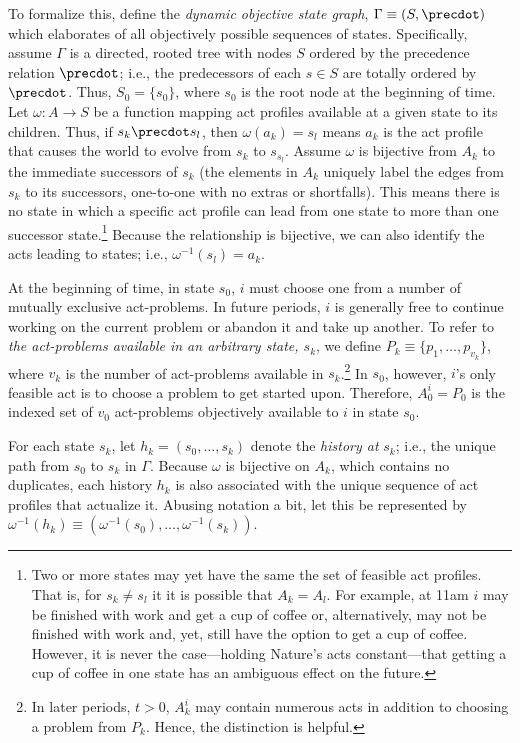 \documentclass[
11pt,
titlepage,
reqno,
]{article}%
\theoremstyle{definition}
\begin{document}
To formalize this,  define the \textit{dynamic objective state graph},  $\Gamma\equiv( S,\precdot)$ which elaborates of all objectively possible sequences of states.
Specifically, assume $\Gamma$ is a directed, rooted tree with nodes $S$ ordered by the precedence relation $\precdot$; i.e., the predecessors of each $s\in S$ are totally ordered by $\precdot$. 
Thus, $S_0=\{s_0\}$, where $s_0$ is the root node at the beginning of time.
Let $\omega:A\rightarrow S$ be a function mapping act profiles available at a given state to its children.	
Thus, if $s_k\precdot s_{l}$, then $\omega(a_{k})=s_{l}$ means  $a_{k}$ is the act profile that causes the world to evolve from $s_k$ to $s_{s_{l}}$.
Assume $\omega$ is bijective from $A_k$ to the immediate successors of $s_k$ (the elements in $A_k$ uniquely label the edges from $s_k$ to its successors, one-to-one with no extras or shortfalls).
This means there is no state in which a specific act profile can lead from one state to more than one successor state.\footnote
{ 
	Two or more states may yet have the same the set of feasible act profiles. That is, for $s_k\ne s_l$ it it is possible that $A_k=A_{l}$. For example, at 11am $i$ may be finished with  work and get a cup of coffee or, alternatively, may not be finished with work and, yet, still have the option to get a cup of coffee. However, it is never the case---holding Nature's acts constant---that getting a cup of coffee in one state has an ambiguous effect on the future.
}
Because the relationship is bijective, we can also identify the acts leading to states; i.e., $\omega^{-1}(s_{l})=a_{k}$.

At the beginning of time, in state $s_0$, $i$ must choose one from  a number of mutually exclusive act-problems.
In future periods, $i$ is generally free to continue working on the current problem or abandon it and take up another.  
To refer to \textit{the act-problems available in an arbitrary state, $s_k$}, we define $P_k\equiv \{p_1,\ldots,p_{v_k}\}$, where $v_k$ is the number of act-problems available in $s_k$.\footnote
{
	In later periods, $t>0$, $A^i_k$ may contain numerous acts in addition to choosing a problem from $P_k$. Hence, the distinction is helpful.
}
In $s_0$, however, $i$'s only feasible act is to choose a problem to get started upon.
Therefore, $A^i_{0}=P_0$ is the indexed set of $v_0$ act-problems objectively available to $i$ in state $s_0$.
	
For each state $s_k$, let $h_k=(s_0,\ldots,s_k)$ denote the \textit{history at} $s_k$; i.e., the unique path from $s_0$ to $s_k$ in $\Gamma$.
Because $\omega$ is bijective on $A_k$, which contains no duplicates, each history $h_k$ is also associated with the unique sequence of act profiles that actualize it.
Abusing notation a bit, let this be represented by  $\omega^{-1}(h_k)\equiv(\omega^{-1}(s_0),\ldots,\omega^{-1}(s_k))$.
\end{document}
